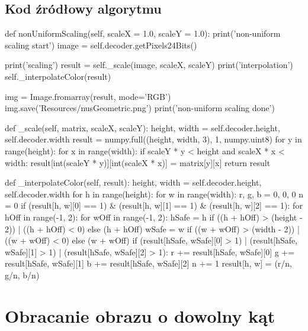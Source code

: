 \documentclass[a4paper,12pt]{book}
\begin{document}
\subsection*{Kod źródłowy algorytmu}
\begin{python}
def nonUniformScaling(self, scaleX = 1.0, scaleY = 1.0):
	print('non-uniform scaling start')
	image = self.decoder.getPixels24Bits()
	
	print('scaling')
	result = self._scale(image, scaleX, scaleY)
	print('interpolation')
	self._interpolateColor(result)
	
	img = Image.fromarray(result, mode='RGB')
	img.save('Resources/nusGeometric.png')
	print('non-uniform scaling done')

def _scale(self, matrix, scaleX, scaleY):
	height, width = self.decoder.height, self.decoder.width
	result = numpy.full((height, width, 3), 1, numpy.uint8)
	for y in range(height):
		for x in range(width):  
			if scaleY * y < height and scaleX * x < width:
				result[int(scaleY * y)][int(scaleX * x)] = matrix[y][x]
	return result

def _interpolateColor(self, result):
	height, width = self.decoder.height, self.decoder.width
	for h in range(height):
		for w in range(width):
			r, g, b = 0, 0, 0
			n = 0
				if (result[h, w][0] == 1) & (result[h, w][1] == 1) & (result[h, w][2] == 1):
					for hOff in range(-1, 2):
						for wOff in range(-1, 2):
							hSafe = h if ((h + hOff) > (height - 2)) | ((h + hOff) < 0) else (h + hOff)
							wSafe = w if ((w + wOff) > (width - 2)) | ((w + wOff) < 0) else (w + wOff)
							if (result[hSafe, wSafe][0] > 1) | (result[hSafe, wSafe][1] > 1) | (result[hSafe, wSafe][2] > 1):
								r += result[hSafe, wSafe][0]
								g += result[hSafe, wSafe][1]
								b += result[hSafe, wSafe][2]
								n += 1
						result[h, w] = (r/n, g/n, b/n)
\end{python}
\section{Obracanie obrazu o dowolny kąt}
\end{document}
